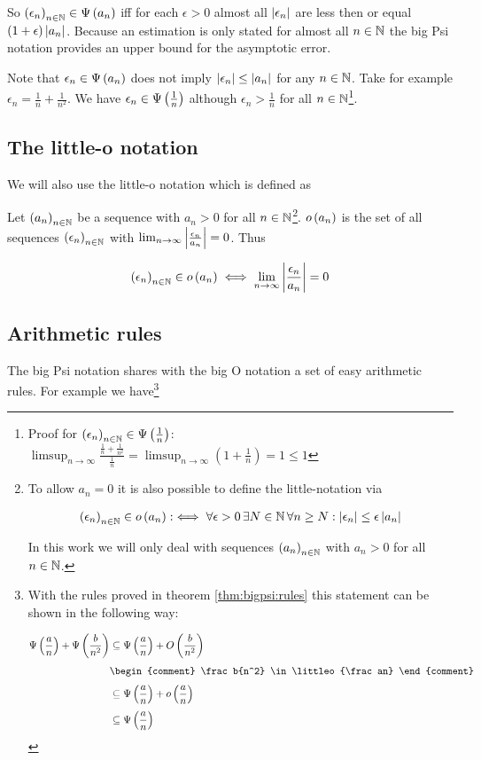 So $\left({\epsilon_n}\right)_{{n}\in\mathbb N}\in\Psi\left( {a_n} \right)$ iff for each $\epsilon > 0$ almost all $\left|{\epsilon_n}\right|$ are less then or equal $(1+\epsilon)\left|{a_n}\right|$. Because an estimation is only stated for almost all $n\in\mathbb N$ the big Psi notation provides an upper bound for the asymptotic error.

Note that $\epsilon_n\in\Psi\left( {a_n} \right)$ does not imply $\left|{\epsilon_n}\right|\le\left|{a_n}\right|$ for any $n\in\mathbb N$. Take for example $\epsilon_n = \frac 1n + \frac 1{n^2}$. We have $\epsilon_n \in \Psi\left( {\frac 1n} \right)$ although $\epsilon_n > \frac 1n$ for all $n\in\mathbb N$\footnote{Proof for $\left({\epsilon_n}\right)_{{n}\in\mathbb N} \in \Psi\left( {\frac 1n} \right)$: $\limsup_{n\to\infty} \frac{\frac 1n + \frac 1{n^2}}{\frac 1n} = \limsup_{n\to\infty} \left(1+\frac 1n\right) = 1 \le 1$}.

\subsection{The little-o notation}

We will also use the little-o notation which is defined as~\cite[pp.~99,~103]{aigner}\cite[p.~385]{hachenberger}\cite{wiki:bigo}

\begin{definition}
  Let $\left({a_n}\right)_{{n}\in\mathbb N}$ be a sequence with $a_n > 0$ for all $n\in\mathbb N$\footnote{To allow $a_n=0$ it is also possible to define the little-notation via~\cite[pp.~448]{graham}\cite{wiki:bigo}

  \begin{align}
    \left({\epsilon_n}\right)_{{n}\in\mathbb N}\in o\left( {a_n} \right) :\iff \forall \epsilon > 0\, \exists N\in\mathbb N\, \forall n \ge N: \left|{\epsilon_n}\right| \le \epsilon \left|{a_n}\right|
  \end{align}

  \noindent In this work we will only deal with sequences $\left({a_n}\right)_{{n}\in\mathbb N}$ with $a_n > 0$ for all $n\in\mathbb N$.
}. $o\left( {a_n} \right)$ is the set of all sequences $\left({\epsilon_n}\right)_{{n}\in\mathbb N}$ with $\lim_{n\to\infty} \left|{\frac{\epsilon_n}{a_n}}\right| = 0$. Thus

  \begin{align}
    \left({\epsilon_n}\right)_{{n}\in\mathbb N}\in o\left( {a_n} \right) \iff \lim_{n\to\infty} \left|{\frac{\epsilon_n}{a_n}}\right| = 0
  \end{align}
\end{definition}

\subsection{Arithmetic rules}

The big Psi notation shares with the big O notation a set of easy arithmetic rules. For example we have\footnote{With the rules proved in theorem \ref{thm:bigpsi:rules} this statement can be shown in the following way:

  \begin{align}
    \bigpsi{\frac an}+\bigpsi{\frac{b}{n^2}} & \subseteq \bigpsi{\frac an} + \bigo{\frac b{n^2}} \nl
    & \begin{comment}
      \frac b{n^2} \in \littleo{\frac an}
    \end{comment} \nl
    & \subseteq \bigpsi{\frac an} + \littleo{\frac an} \nl
    & \subseteq \bigpsi{\frac an}
  \end{align}
}

